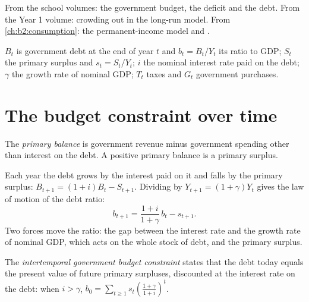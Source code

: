 \begin{recall}
From the school volumes: the government budget, the deficit and the debt. From the Year 1 volume: crowding out in the
long-run model. From \cref{ch:b2:consumption}: the permanent-income model and .
\end{recall}

\begin{notation}\label{not:b2:government-debt:symbols}
$B_t$ is government debt at the end of year $t$ and $b_t = B_t/Y_t$ its ratio to GDP; $S_t$ the primary surplus and $s_t = S_t/Y_t$; $i$ the nominal interest rate paid on
the debt; $\gamma$ the growth rate of nominal GDP; $T_t$ taxes and $G_t$ government purchases.
\end{notation}

\section{The budget constraint over time}\label{sec:b2:government-debt:budget}

\begin{definition}\label{def:b2:government-debt:primary-balance}
The \emph{primary balance} is government revenue minus government spending other than interest on
the debt. A positive primary balance is a primary surplus.
\end{definition}

Each year the debt grows by the interest paid on it and falls by the primary surplus: $B_{t+1} = (1 + i)B_t - S_{t+1}$. Dividing by $Y_{t+1} = (1 + \gamma)Y_t$ gives the
law of motion of the debt ratio:
\begin{equation}\label{eq:b2:government-debt:dynamics}
b_{t+1} = \frac{1 + i}{1 + \gamma}\,b_t - s_{t+1}.
\end{equation}
Two forces move the ratio: the gap between the interest rate and the growth rate of nominal GDP, which acts on the whole
stock of debt, and the primary surplus.

\begin{definition}\label{def:b2:government-debt:igbc}
The \emph{intertemporal government budget constraint} states that the
debt today equals the present value of future primary surpluses, discounted at the interest rate on the debt: when
$i > \gamma$, $b_0 = \sum_{t \ge 1} s_t\left(\frac{1 + \gamma}{1 + i}\right)^t$.
\end{definition}

